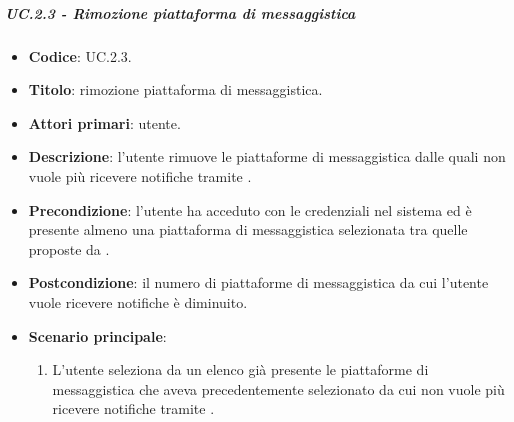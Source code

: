 			
	\subparagraph{UC\theuccount.2.3 - Rimozione piattaforma di messaggistica}
	\begin{itemize}
		\item \textbf{Codice}: UC\theuccount.2.3.
		\item \textbf{Titolo}: rimozione piattaforma di messaggistica.
		\item \textbf{Attori primari}: utente.
		\item \textbf{Descrizione}: l'utente rimuove le piattaforme di messaggistica dalle quali non vuole più ricevere notifiche tramite \progetto.
		\item \textbf{Precondizione}: l'utente ha acceduto con le credenziali nel sistema ed è presente almeno una piattaforma di messaggistica selezionata tra quelle proposte da \progetto.
		\item \textbf{Postcondizione}: il numero di piattaforme di messaggistica da cui l'utente vuole ricevere notifiche è diminuito.
		\item \textbf{Scenario principale}:
		\begin{enumerate}
			\item L'utente seleziona da un elenco già presente le piattaforme di messaggistica che aveva precedentemente selezionato da cui non vuole più ricevere notifiche tramite \progetto.
		\end{enumerate}
	\end{itemize}


		
